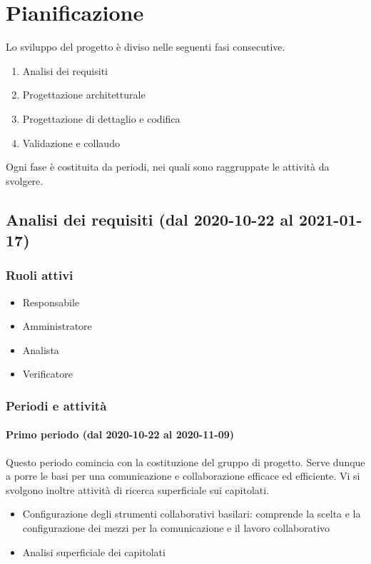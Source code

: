 \section{Pianificazione}
Lo sviluppo del progetto è diviso nelle seguenti fasi consecutive.
\begin{enumerate}
	\item Analisi dei requisiti
	\item Progettazione architetturale
	\item Progettazione di dettaglio e codifica
	\item Validazione e collaudo
\end{enumerate}
Ogni fase è costituita da periodi, nei quali sono raggruppate le attività da svolgere.

\subsection{Analisi dei requisiti (dal 2020-10-22 al 2021-01-17)}

\subsubsection{Ruoli attivi}
\begin{itemize}
	\item Responsabile
	\item Amministratore
	\item Analista
	\item Verificatore
\end{itemize}

\subsubsection{Periodi e attività}

\paragraph{Primo periodo (dal 2020-10-22 al 2020-11-09)}
Questo periodo comincia con la costituzione del gruppo di progetto. Serve dunque a porre le basi per una comunicazione e collaborazione efficace ed efficiente. Vi si svolgono inoltre attività di ricerca superficiale sui capitolati.

\begin{itemize}
	\item Configurazione degli strumenti collaborativi basilari: comprende la scelta e la configurazione dei mezzi per la comunicazione e il lavoro collaborativo
	\item Analisi superficiale dei capitolati
	
\end{itemize}

